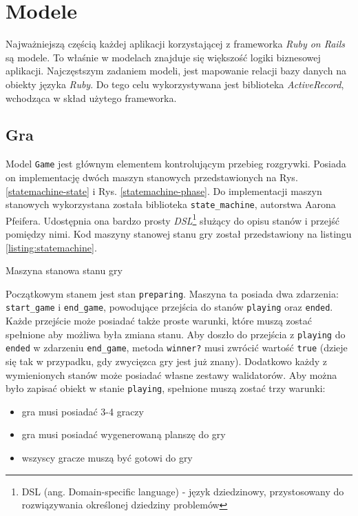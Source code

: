 \documentclass[11pt,twoside]{report}
\providecommand{\imref}[1]{Rys. \ref{#1}} %
\begin{document}
\section{Modele}\label{sec:models}

Najważniejszą częścią każdej aplikacji korzystającej z frameworka
\emph{Ruby on Rails} są modele. To właśnie w modelach znajduje się
większość logiki biznesowej aplikacji. Najczęstszym zadaniem modeli,
jest mapowanie relacji bazy danych na obiekty języka \emph{Ruby}. Do
tego celu wykorzystywana jest biblioteka \emph{ActiveRecord},
wchodząca w skład użytego frameworka.

\subsection{Gra}
Model \texttt{Game} jest głównym elementem kontrolującym przebieg
rozgrywki. Posiada on implementację dwóch maszyn stanowych
przedstawionych na \imref{statemachine-state} i
\imref{statemachine-phase}. Do implementacji maszyn stanowych
wykorzystana została biblioteka \texttt{state\_machine}, autorstwa
Aarona Pfeifera. Udostępnia ona bardzo prosty \emph{DSL}\footnote{DSL
  (ang. Domain-specific language) - język dziedzinowy, przystosowany
  do rozwiązywania określonej dziedziny problemów} służący do opisu
stanów i przejść pomiędzy nimi. Kod maszyny stanowej stanu gry został
przedstawiony na listingu \ref{listing:statemachine}.

\begin{listing}
  
  \caption{Maszyna stanowa stanu gry}
  \label{listing:statemachine}
\end{listing}

Początkowym stanem jest stan \texttt{preparing}.  Maszyna ta posiada
dwa zdarzenia: \texttt{start\_game} i \texttt{end\_game}, powodujące
przejścia do stanów \texttt{playing} oraz \texttt{ended}. Każde
przejście może posiadać także proste warunki, które muszą zostać
spełnione aby możliwa była zmiana stanu. Aby doszło do przejścia z
\texttt{playing} do \texttt{ended} w zdarzeniu \texttt{end\_game},
metoda \texttt{winner?}  musi zwrócić wartość \texttt{true} (dzieje
się tak w przypadku, gdy zwycięzca gry jest już znany). Dodatkowo
każdy z wymienionych stanów może posiadać własne zestawy
walidatorów. Aby można było zapisać obiekt w stanie \texttt{playing},
spełnione muszą zostać trzy warunki:

\begin{itemize}
\item gra musi posiadać 3-4 graczy
\item gra musi posiadać wygenerowaną planszę do gry
\item wszyscy gracze muszą być gotowi do gry
\end{itemize}
\end{document}
